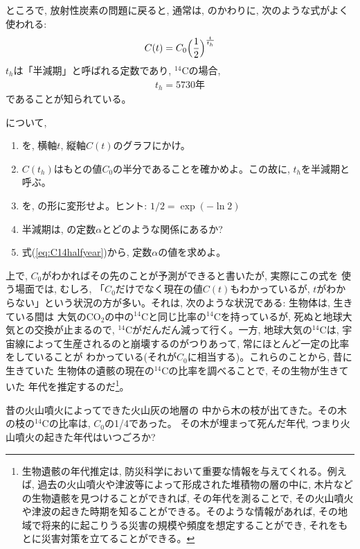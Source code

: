 ところで, 放射性炭素の問題に戻ると, 通常は, のかわりに, 
次のような式がよく使われる: 
\begin{eqnarray}
C(t)=C_0\Bigl(\frac{1}{2}\Bigr)^{\frac{t}{t_h}}\label{eq:C14disint5}
\end{eqnarray}
$t_h$は「半減期」と呼ばれる定数であり, $^{14}$Cの場合,
\begin{eqnarray}
t_h=5730\text{年}\label{eq:C14halfyear}
\end{eqnarray}
であることが知られている。
\vv

\begin{q}\label{q:funct_52} について, 
\begin{enumerate}
\item {}を, 横軸$t$, 縦軸$C(t)$のグラフにかけ。
\item $C(t_h)$はもとの値$C_0$の半分であることを確かめよ。この故に, $t_h$を半減期と呼ぶ。
\item {}を, の形に変形せよ。ヒント: $1/2=\exp(-\ln 2)$
\item 半減期は, の定数$\alpha$とどのような関係にあるか?
\item 式(\ref{eq:C14halfyear})から, 定数$\alpha$の値を求めよ。
\end{enumerate}\end{q}
\vv

上で, $C_0$がわかればその先のことが予測ができると書いたが, 実際にこの式を
使う場面では, むしろ, 「$C_0$だけでなく現在の値$C(t)$もわかっているが, 
$t$がわからない」という状況の方が多い。それは, 次のような状況である: 
生物体は, 生きている間は
大気のCO$_2$の中の$^{14}$Cと同じ比率の$^{14}$Cを持っているが, 
死ぬと地球大気との交換が止まるので, $^{14}$Cがだんだん減って行く。一方, 地球大気の$^{14}$Cは, 
宇宙線によって生産されるのと崩壊するのがつりあって, 常にほとんど一定の比率をしていることが
わかっている(それが$C_0$に相当する)。これらのことから, 昔に生きていた
生物体の遺骸の現在の$^{14}$Cの比率を調べることで, その生物が生きていた
年代を推定するのだ\footnote{
生物遺骸の年代推定は, 防災科学において重要な情報を与えてくれる。例えば, 
過去の火山噴火や津波等によって形成された堆積物の層の中に, 
木片などの生物遺骸を見つけることができれば, その年代を測ることで, 
その火山噴火や津波の起きた時期を知ることができる。そのような情報があれば, 
その地域で将来的に起こりうる災害の規模や頻度を想定することができ, 
それをもとに災害対策を立てることができる。}。
\hv

\begin{q}\label{q:funct_54} 昔の火山噴火によってできた火山灰の地層の
中から木の枝が出てきた。その木の枝の$^{14}$Cの比率は, $C_0$の1/4であった。
その木が埋まって死んだ年代, つまり火山噴火の起きた年代はいつごろか?\end{q}
\hv 


